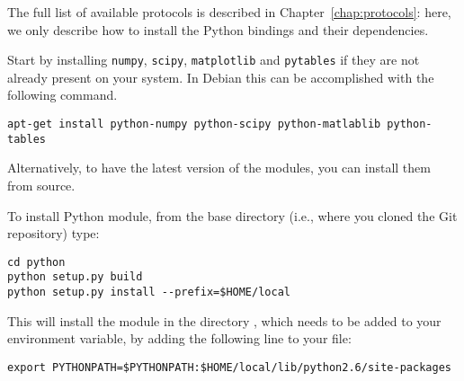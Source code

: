 The full list of available protocols is described in
Chapter~\ref{chap:protocols}: here, we only describe how to install
the Python bindings and their dependencies.

Start by installing  \texttt{numpy}, \texttt{scipy},
\texttt{matplotlib} and \texttt{pytables} if they are not already
present on your system. In Debian this can be accomplished with the
following command.
\begin{lstlisting}
apt-get install python-numpy python-scipy python-matlablib python-tables
\end{lstlisting}
Alternatively, to have the latest version of the modules, you can
install them from source.

To install \progname Python module, from the base directory (i.e.,
where you cloned the Git repository) type:
\begin{lstlisting}
cd python
python setup.py build
python setup.py install --prefix=$HOME/local
\end{lstlisting}

This will install the module in the directory
, which needs to
be added to your  environment variable, by
adding the following line to your  file:
\begin{lstlisting}
export PYTHONPATH=$PYTHONPATH:$HOME/local/lib/python2.6/site-packages
\end{lstlisting}


